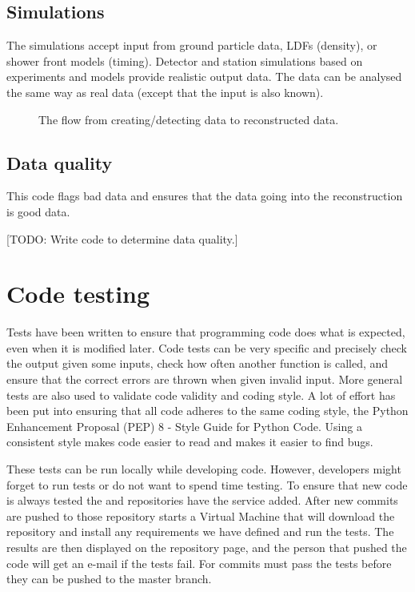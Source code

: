 \subsection{Simulations}

The simulations accept input from \corsika ground particle data, LDFs
(density), or shower front models (timing). Detector and station simulations based on experiments and models provide realistic output data. The data can be analysed the same way as real \hisparc data (except that the input is
also known).

\begin{figure}
    \centering
    
    \caption{ The flow from
             creating/detecting data to reconstructed data.}
    \label{fig:sapphire-flow}
\end{figure}


\subsection{Data quality}

This code flags bad data and ensures that the data going into the reconstruction is good data.

[TODO: Write code to determine data quality.]


\section{Code testing}

Tests have been written to ensure that programming code does what is expected, even when it is modified later. Code tests can be very specific and precisely check the output given some inputs, check how often another function is called, and ensure that the correct errors are thrown when given invalid input. More general tests are also used to validate code validity and coding style. A lot of effort has been put into ensuring that all \python code adheres to the same coding style, the Python Enhancement Proposal (PEP) 8 - Style Guide for Python Code. Using a consistent style makes code easier to read and makes it easier to find bugs.

These tests can be run locally while developing code. However, developers might forget to run tests or do not want to spend time testing. To ensure that new code is always tested the \sapphire and \jsparc repositories have the \travis service \cite{travis} added. After new commits are pushed to those repository \travis starts a Virtual Machine that will download the repository and install any requirements we have defined and run the tests. The results are then displayed on the repository page, and the person that pushed the code will get an e-mail if the tests fail. For \sapphire commits must pass the tests before they can be pushed to the master branch.


